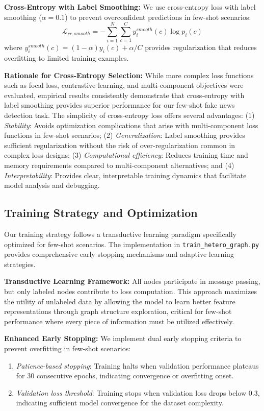 \textbf{Cross-Entropy with Label Smoothing:} We use cross-entropy loss with label smoothing ($\alpha = 0.1$) to prevent overconfident predictions in few-shot scenarios:
\begin{equation}
\mathcal{L}_{ce\_smooth} = -\sum_{i=1}^{N} \sum_{c=1}^{C} y_i^{smooth}(c) \log p_i(c)
\end{equation}
where $y_i^{smooth}(c) = (1-\alpha)y_i(c) + \alpha/C$ provides regularization that reduces overfitting to limited training examples.

\textbf{Rationale for Cross-Entropy Selection:} While more complex loss functions such as focal loss, contrastive learning, and multi-component objectives were evaluated, empirical results consistently demonstrate that cross-entropy with label smoothing provides superior performance for our few-shot fake news detection task. The simplicity of cross-entropy loss offers several advantages: (1) \emph{Stability}: Avoids optimization complications that arise with multi-component loss functions in few-shot scenarios; (2) \emph{Generalization}: Label smoothing provides sufficient regularization without the risk of over-regularization common in complex loss designs; (3) \emph{Computational efficiency}: Reduces training time and memory requirements compared to multi-component alternatives; and (4) \emph{Interpretability}: Provides clear, interpretable training dynamics that facilitate model analysis and debugging.

\subsection{Training Strategy and Optimization}

Our training strategy follows a transductive learning paradigm specifically optimized for few-shot scenarios. The implementation in \texttt{train\_hetero\_graph.py} provides comprehensive early stopping mechanisms and adaptive learning strategies.

\textbf{Transductive Learning Framework:} All nodes participate in message passing, but only labeled nodes contribute to loss computation. This approach maximizes the utility of unlabeled data by allowing the model to learn better feature representations through graph structure exploration, critical for few-shot performance where every piece of information must be utilized effectively.

\textbf{Enhanced Early Stopping:} We implement dual early stopping criteria to prevent overfitting in few-shot scenarios:
\begin{enumerate}
\item \emph{Patience-based stopping}: Training halts when validation performance plateaus for 30 consecutive epochs, indicating convergence or overfitting onset.
\item \emph{Validation loss threshold}: Training stops when validation loss drops below 0.3, indicating sufficient model convergence for the dataset complexity.
\end{enumerate}

